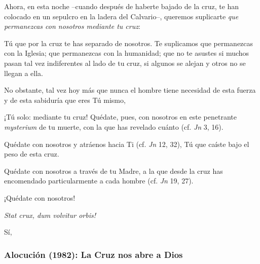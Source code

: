 \begin{body}
Ahora, en esta noche –cuando después de haberte bajado de la cruz, te han colocado en un sepulcro en la ladera del Calvario–, queremos suplicarte \textit{que permanezcas con nosotros mediante tu cruz}:


\newpage 
\begin{bodyprose}
Tú que por la cruz te has separado de nosotros. 
   Te suplicamos que permanezcas con la Iglesia; 
   que permanezcas con la humanidad; 
   que no te asustes si muchos pasan 
   tal vez indiferentes al lado de tu cruz, 
   si algunos se alejan y otros no se llegan a ella.

No obstante, tal vez hoy más que nunca 
   el hombre tiene necesidad de esta fuerza 
   y de esta sabiduría que eres Tú mismo, 

¡Tú solo: mediante tu cruz!
   Quédate, pues, con nosotros 
   en este penetrante \textit{mysterium} de tu muerte, 
   con la que has revelado cuánto  (cf. \textit{Jn} 3, 16). 

Quédate con nosotros y atráenos hacia Ti (cf. \textit{Jn} 12, 32), 
   Tú que caíste bajo el peso de esta cruz. 

Quédate con nosotros a través de tu Madre, 
   a la que desde la cruz has encomendado 
   particularmente a cada hombre (cf. \textit{Jn} 19, 27).

¡Quédate con nosotros!
\end{bodyprose}

\textit{Stat crux, dum volvitur orbis!} 

Sí, 

\end{body}


\newpage 
\subsubsection{Alocución (1982): La Cruz nos abre a Dios}


